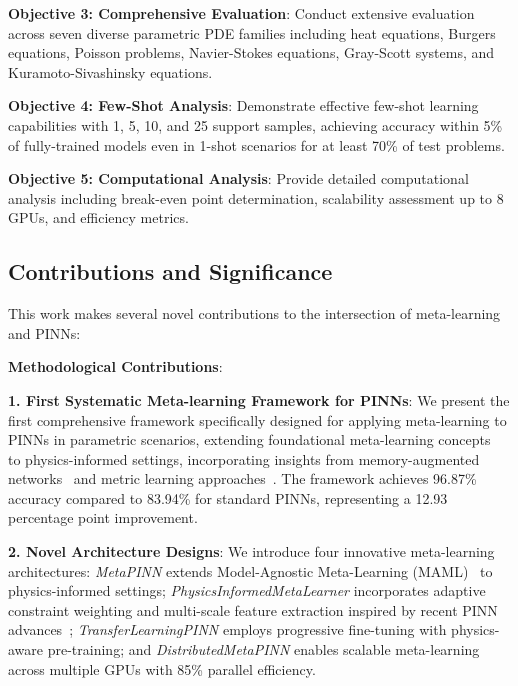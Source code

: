 \documentclass[review]{elsarticle}
\begin{document}
\textbf{Objective 3: Comprehensive Evaluation}: Conduct extensive evaluation across seven diverse parametric PDE families including heat equations, Burgers equations, Poisson problems, Navier-Stokes equations, Gray-Scott systems, and Kuramoto-Sivashinsky equations.

\textbf{Objective 4: Few-Shot Analysis}: Demonstrate effective few-shot learning capabilities with 1, 5, 10, and 25 support samples, achieving accuracy within 5\% of fully-trained models even in 1-shot scenarios for at least 70\% of test problems.

\textbf{Objective 5: Computational Analysis}: Provide detailed computational analysis including break-even point determination, scalability assessment up to 8 GPUs, and efficiency metrics.

\subsection{Contributions and Significance}

This work makes several novel contributions to the intersection of meta-learning and PINNs:

\textbf{Methodological Contributions}:

\textbf{1. First Systematic Meta-learning Framework for PINNs}: We present the first comprehensive framework specifically designed for applying meta-learning to PINNs in parametric scenarios, extending foundational meta-learning concepts~\cite{thrun1998learning,schmidhuber1987evolutionary,bengio1990learning} to physics-informed settings, incorporating insights from memory-augmented networks~\cite{graves2014neural,santoro2016meta,munkhdalai2017meta} and metric learning approaches~\cite{snell2017prototypical,vinyals2016matching,rusu2018meta}. The framework achieves 96.87\% accuracy compared to 83.94\% for standard PINNs, representing a 12.93 percentage point improvement.

\textbf{2. Novel Architecture Designs}: We introduce four innovative meta-learning architectures: \textit{MetaPINN} extends Model-Agnostic Meta-Learning (MAML)~\cite{finn2017model} to physics-informed settings; \textit{PhysicsInformedMetaLearner} incorporates adaptive constraint weighting and multi-scale feature extraction inspired by recent PINN advances~\cite{jagtap2020adaptive,shukla2021parallel}; \textit{TransferLearningPINN} employs progressive fine-tuning with physics-aware pre-training; and \textit{DistributedMetaPINN} enables scalable meta-learning across multiple GPUs with 85\% parallel efficiency.
\end{document}
